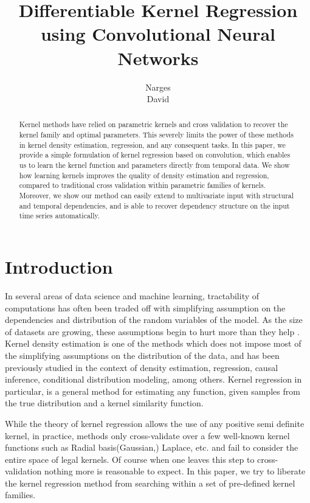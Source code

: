\documentclass{article} %
\title{Differentiable Kernel Regression using Convolutional Neural Networks}
\author{
Narges \\
\AND
David
}
\begin{document}
\maketitle
\begin{abstract}
Kernel methods have relied on parametric kernels and cross validation to recover the kernel family and optimal parameters. This severely limits the power of these methods in kernel density estimation, regression, and any consequent tasks. In this paper, we provide a simple formulation of kernel regression based on convolution, which enables us to learn the kernel function and parameters directly from temporal data. We show how learning kernels improves the quality of density estimation and regression, compared to traditional cross validation within parametric families of kernels. Moreover, we show our method can easily extend to multivariate input with structural and temporal dependencies, and is able to recover dependency structure on the input time series automatically.
\end{abstract}

\section{Introduction}

In several areas of data science and machine learning, tractability of computations has often been traded off with simplifying assumption on the dependencies and distribution of the random variables of the model.\cite{} \cite{} \cite{} \cite{} As the size of datasets are growing, these assumptions begin to hurt more than they help \cite{} \cite{} \cite{}. Kernel density estimation\cite{} is one of the methods which does not impose most of the simplifying assumptions on the distribution of the data\cite{}, and has been previously studied in the context of density estimation, regression, causal inference, conditional distribution modeling, among others. Kernel regression\cite{} in particular, is a general method for estimating any function, given samples from the true distribution and a kernel similarity function. 

While the theory of kernel regression allows the use of any positive semi definite kernel, in practice, methods only cross-validate over a few well-known kernel functions such as Radial basis(Gaussian,) Laplace, etc. and fail to consider the entire space of legal kernels. Of course when one leaves this step to cross-validation nothing more is reasonable to expect. In this paper, we try to liberate the kernel regression method from searching within a set of pre-defined kernel families.
\end{document}
